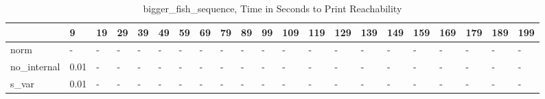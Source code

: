 \begin{table}
\caption{bigger_fish_sequence, Time in Seconds to Print Reachability}
\label{bigger_fish_sequence_states_time}
\begin{tabular}{lllllllllllllllllllll}
\toprule
 & 9 & 19 & 29 & 39 & 49 & 59 & 69 & 79 & 89 & 99 & 109 & 119 & 129 & 139 & 149 & 159 & 169 & 179 & 189 & 199 \\
\midrule
norm & - & - & - & - & - & - & - & - & - & - & - & - & - & - & - & - & - & - & - & - \\
no_internal & 0.01 & - & - & - & - & - & - & - & - & - & - & - & - & - & - & - & - & - & - & - \\
s_var & 0.01 & - & - & - & - & - & - & - & - & - & - & - & - & - & - & - & - & - & - & - \\
\bottomrule
\end{tabular}
\end{table}
